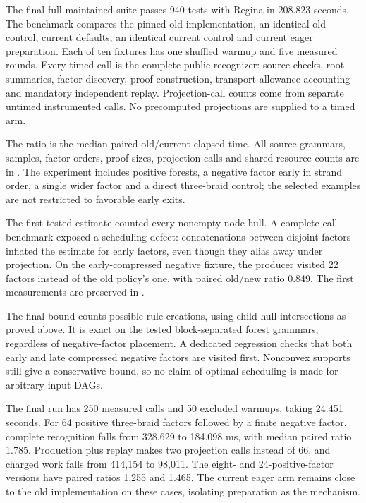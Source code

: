 The final full maintained suite passes 940 tests with Regina in 208.823 seconds.
The benchmark compares the pinned old implementation, an identical old
control, current defaults, an identical current control and current eager
preparation. Each of ten fixtures has one shuffled warmup and five measured
rounds. Every timed call is the complete public recognizer: source checks,
root summaries, factor discovery, proof construction, transport allowance
accounting and mandatory independent replay. Projection-call counts come
from separate untimed instrumented calls. No precomputed projections are
supplied to a timed arm.



The ratio is the median paired old/current elapsed time. All source
grammars, samples, factor orders, proof sizes, projection calls and shared
resource counts are in .
The experiment includes positive forests, a negative factor early in
strand order, a single wider factor and a direct three-braid control;
the selected examples are not restricted to favorable early exits.


The first tested estimate counted every nonempty node hull. A complete-call
benchmark exposed a scheduling defect: concatenations between disjoint
factors inflated the estimate for early factors, even though they alias
away under projection. On the early-compressed negative fixture, the
producer visited 22 factors instead of the old policy's one, with paired
old/new ratio 0.849. The first measurements are preserved in
.

The final bound counts possible rule creations, using child-hull
intersections as proved above. It is exact on the tested block-separated
forest grammars, regardless of negative-factor placement. A dedicated
regression checks that both early and late compressed negative factors are
visited first. Nonconvex supports still give a conservative bound, so no
claim of optimal scheduling is made for arbitrary input DAGs.

The final run has 250 measured calls and 50 excluded warmups, taking
24.451 seconds. For 64 positive three-braid factors followed by a finite
negative factor, complete recognition falls from 328.629 to 184.098 ms,
with median paired ratio 1.785. Production plus replay makes two projection
calls instead of 66, and charged work falls from 414,154 to 98,011.
The eight- and 24-positive-factor versions have paired ratios 1.255 and
1.465. The current eager arm remains close to the old implementation on
these cases, isolating preparation as the mechanism.

